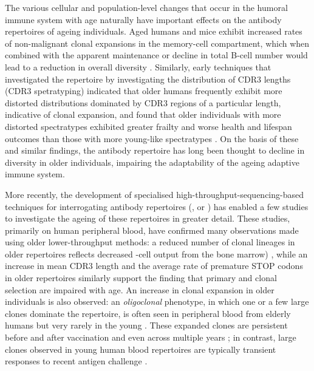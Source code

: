 The various cellular and population-level changes that occur in the humoral immune system with age naturally have important effects on the antibody repertoires of ageing individuals. Aged humans \parencite{siegrist2009extremes} and mice \parencite{dunnwalters2010bcellageing} exhibit increased rates of non-malignant clonal expansions in the memory-cell compartment, which when combined with the apparent maintenance or decline in total B-cell number would lead to a reduction in overall diversity \parencite{dunnwalters2010bcellageing}. Similarly, early techniques that investigated the repertoire by investigating the distribution of CDR3 lengths (CDR3 spetratyping) indicated that older humans frequently exhibit more distorted distributions dominated by CDR3 regions of a particular length, indicative of clonal expansion, and found that older individuals with more distorted spectratypes exhibited greater frailty and worse health and lifespan outcomes than those with more young-like spectratypes \parencite{gibson2009spectratyping}. On the basis of these and similar findings, the antibody repertoire has long been thought to decline in diversity in older individuals, impairing the adaptability of the ageing adaptive immune system.

More recently, the development of specialised high-throughput-sequencing-based techniques for interrogating antibody repertoires (\Igseq, or \igseq \parencite{weinstein2009igseq,georgiou2014promise}) has enabled a few studies to investigate the ageing of these repertoires in greater detail. These studies, primarily on human peripheral blood, have confirmed many observations made using older lower-throughput methods: a reduced number of clonal lineages in older repertoires reflects decreased \naive-cell output from the bone marrow) \parencite{jiang2013vaccine}, while an increase in mean CDR3 length \parencite{wang2014ageing} and the average rate of premature STOP codons \parencite{debourcy2017ageing} in older repertoires similarly support the finding that primary and clonal selection are impaired with age. 
An increase in clonal expansion in older individuals is also observed: 
an \textit{oligoclonal} phenotype, in which one or a few large clones dominate the repertoire, is often seen in peripheral blood from elderly humans but very rarely in the young \parencite{wang2014ageing,debourcy2017ageing}. These expanded clones are persistent before and after vaccination \parencite{debourcy2017ageing} and even across multiple years \parencite{wang2014ageing}; in contrast, large clones observed in young human blood repertoires are typically transient responses to recent antigen challenge \parencite{wang2014ageing}.

